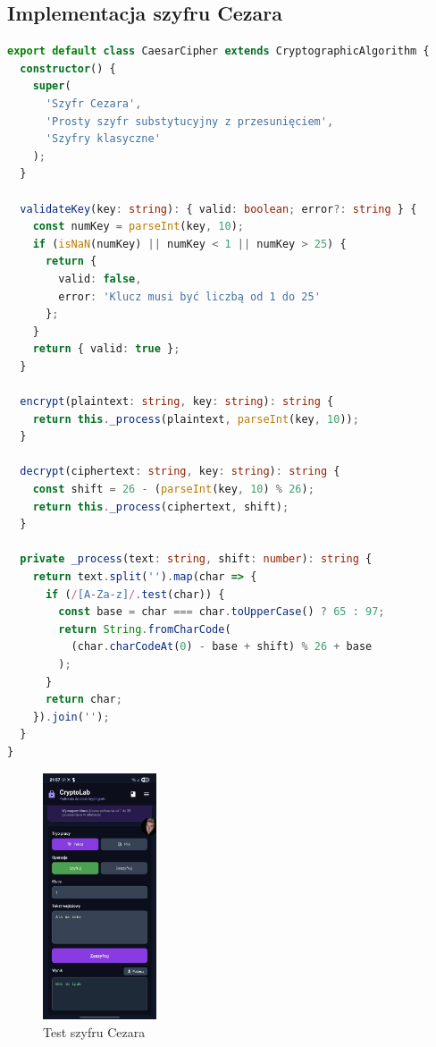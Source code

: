 \documentclass[12pt,a4paper]{article}
\begin{document}
\subsection{Implementacja szyfru Cezara}
\begin{lstlisting}[language=TypeScript, caption={Szczegóły implementacji CaesarCipher}]
export default class CaesarCipher extends CryptographicAlgorithm {
  constructor() {
    super(
      'Szyfr Cezara',
      'Prosty szyfr substytucyjny z przesunięciem',
      'Szyfry klasyczne'
    );
  }

  validateKey(key: string): { valid: boolean; error?: string } {
    const numKey = parseInt(key, 10);
    if (isNaN(numKey) || numKey < 1 || numKey > 25) {
      return { 
        valid: false, 
        error: 'Klucz musi być liczbą od 1 do 25' 
      };
    }
    return { valid: true };
  }

  encrypt(plaintext: string, key: string): string {
    return this._process(plaintext, parseInt(key, 10));
  }

  decrypt(ciphertext: string, key: string): string {
    const shift = 26 - (parseInt(key, 10) % 26);
    return this._process(ciphertext, shift);
  }

  private _process(text: string, shift: number): string {
    return text.split('').map(char => {
      if (/[A-Za-z]/.test(char)) {
        const base = char === char.toUpperCase() ? 65 : 97;
        return String.fromCharCode(
          (char.charCodeAt(0) - base + shift) % 26 + base
        );
      }
      return char;
    }).join('');
  }
}
\end{lstlisting}
\begin{figure}[H]
    \centering
    \includegraphics[width=0.3\textwidth]{img/test_cezara.jpg}
    \caption{Test szyfru Cezara}
\end{figure}
\end{document}
